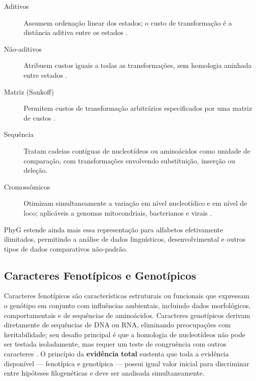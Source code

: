 \begin{description}
    \item[Aditivos] Assumem ordenação linear dos estados; o custo de transformação é a distância aditiva entre os estados \parencite{farris1970}.

    \item[Não-aditivos] Atribuem custos iguais a todas as transformações, sem homologia aninhada entre estados \parencite{fitch1971}.

    \item[Matriz (Sankoff)] Permitem custos de transformação arbitrários especificados por uma matriz de custos \parencite{sankoff1975,sankoffrousseau1975}.

    \item[Sequência] Tratam cadeias contíguas de nucleotídeos ou aminoácidos como unidade de comparação, com transformações envolvendo substituição, inserção ou deleção.

    \item[Cromossômicos] Otimizam simultaneamente a variação em nível nucleotídico e em nível de loco; aplicáveis a genomas mitocondriais, bacterianos e virais \parencite{wheeleretal2006}.
\end{description}

PhyG \parencite{wheeleretal2024} estende ainda mais essa representação para alfabetos efetivamente ilimitados, permitindo a análise de dados linguísticos, desenvolvimental e outros tipos de dados comparativos não-padrão.

\subsection{Caracteres Fenotípicos e Genotípicos}

Caracteres fenotípicos são características estruturais ou funcionais que expressam o genótipo em conjunto com influências ambientais, incluindo dados morfológicos, comportamentais e de sequências de aminoácidos. Caracteres genotípicos derivam diretamente de sequências de DNA ou RNA, eliminando preocupações com heritabilidade; seu desafio principal é que a homologia de nucleotídeos não pode ser testada isoladamente, mas requer um teste de congruência com outros caracteres \parencite{wheeleretal2006}. O princípio da \textbf{evidência total} \parencite{kluge1989} sustenta que toda a evidência disponível --- fenotípica e genotípica --- possui igual valor inicial para discriminar entre hipóteses filogenéticas e deve ser analisada simultaneamente.

